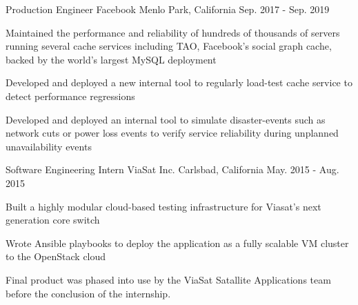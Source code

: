 \begin{cventries}
  \cventry
    {Production Engineer} %
    {
      \hspace{0.7em}
      Facebook
    } %
    {Menlo Park, California} %
    {Sep. 2017 - Sep. 2019} %
    {
      \begin{cvitems} %
        \item {
          Maintained the performance and reliability of hundreds of thousands
          of servers running several cache services including TAO, Facebook's
          social graph cache, backed by the world's largest MySQL deployment
        }
        \item {
          Developed and deployed a new internal tool to regularly
          load-test cache service to detect performance regressions
        } 
        \item {
          Developed and deployed an internal tool to simulate disaster-events
          such as network cuts or power loss events to verify service
          reliability during unplanned unavailability events
        }
      \end{cvitems}
    }

%
  \cventry
    {Software Engineering Intern} %
    {
      ViaSat Inc.
    } %
    {Carlsbad, California} %
    {May. 2015 - Aug. 2015} %
    {
      \begin{cvitems} %
        \item {Built a highly modular cloud-based testing infrastructure for Viasat's next generation core switch}
        \item {Wrote Ansible playbooks to deploy the application as a fully scalable VM cluster to the OpenStack cloud}
        \item {
          Final product was phased into use by the ViaSat Satallite Applications
          team before the conclusion of the internship.
        }
      \end{cvitems}
    }


\end{cventries}
